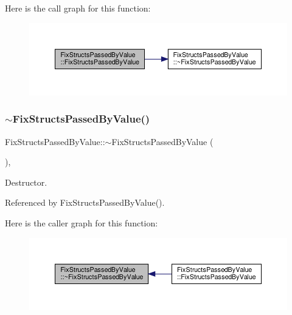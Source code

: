 Here is the call graph for this function\+:
\nopagebreak
\begin{figure}[H]
\begin{center}
\leavevmode
\includegraphics[width=350pt]{d3/db3/classFixStructsPassedByValue_af23bf72c70aa5551ee14d7d77716a631_cgraph}
\end{center}
\end{figure}
\mbox{\label{classFixStructsPassedByValue_a3c2599e7977b35f4617dcc259468294c}} 
\subsubsection{\texorpdfstring{$\sim$\+Fix\+Structs\+Passed\+By\+Value()}{~FixStructsPassedByValue()}}
{\footnotesize\ttfamily Fix\+Structs\+Passed\+By\+Value\+::$\sim$\+Fix\+Structs\+Passed\+By\+Value (\begin{DoxyParamCaption}{ }\end{DoxyParamCaption})\hspace{0.3cm}{\ttfamily [override]}, {\ttfamily [default]}}



Destructor. 



Referenced by Fix\+Structs\+Passed\+By\+Value().

Here is the caller graph for this function\+:
\nopagebreak
\begin{figure}[H]
\begin{center}
\leavevmode
\includegraphics[width=350pt]{d3/db3/classFixStructsPassedByValue_a3c2599e7977b35f4617dcc259468294c_icgraph}
\end{center}
\end{figure}


